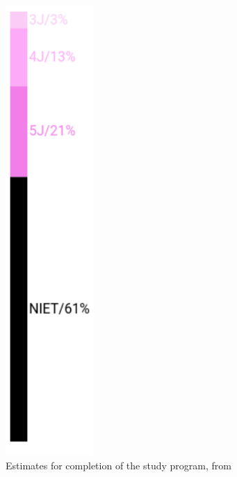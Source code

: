 \begin{figure}
\begin{minipage}[b]{0.48\textwidth}
        \includegraphics[width=0.3\textwidth]{figures/trajectory-finish_2.png}
        \caption{Estimates for completion of the study program, from \cite{LISSA}}
        \label{fig:trajectory-finish_1.png}
    \end{minipage}
    \hfill
    \begin{minipage}[b]{0.48\textwidth}
        \centering

\end{minipage}
\end{figure}
